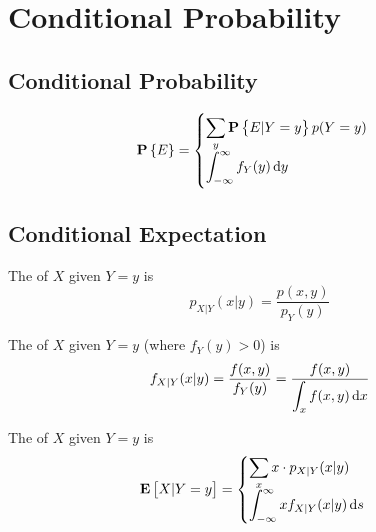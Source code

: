 \chapter{Conditional Probability}

\section{Conditional Probability}

\begin{theorem}
    \begin{equation}
        \probability{E} = \begin{cases}
            \displaystyle \sum_y \probability{E|Y = y} p(Y=y) \\
            \displaystyle \int_{-\infty}^\infty f_Y(y) \dif{y}
        \end{cases}
    \end{equation}    
\end{theorem}


\section{Conditional Expectation}

\begin{definition}
    The  of $X$ given $Y=y$ is 
    \begin{equation}
        p_{X|Y}(x|y) = \dfrac{p(x,y)}{p_Y (y)}
    \end{equation}
    
    The  of $X$ given $Y=y$ (where $f_Y (y) > 0$) is 
    \begin{equation}
        f_{X|Y}(x|y) = \dfrac{f(x,y)}{f_Y (y)} = \dfrac{f(x,y)}{\displaystyle \int_x f(x,y) \dif{x}}
    \end{equation}
\end{definition}





\begin{definition}
    The  of $X$ given $Y=y$ is 
    \begin{equation}
        \displaystyle \expect{X|Y=y} = \begin{cases}
            \displaystyle \sum_x x \cdot p_{X|Y}(x|y) \\
            \displaystyle \int_{-\infty}^\infty x f_{X|Y} (x|y) \dif{s}
        \end{cases} 
    \end{equation}
\end{definition}

